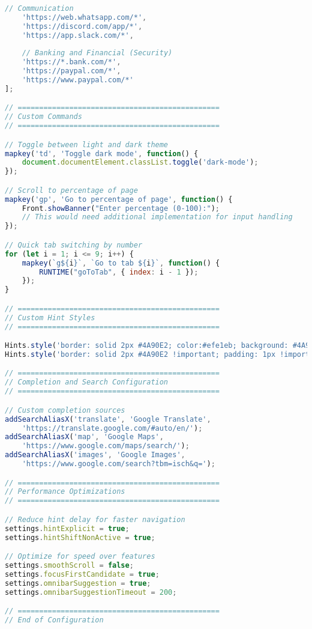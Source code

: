 \documentclass[11pt,a4paper,oneside]{book}
\begin{document}
\begin{codebox}
\begin{lstlisting}[language=JavaScript]
    // Communication
    'https://web.whatsapp.com/*',
    'https://discord.com/app/*',
    'https://app.slack.com/*',
    
    // Banking and Financial (Security)
    'https://*.bank.com/*',
    'https://paypal.com/*',
    'https://www.paypal.com/*'
];

// ===============================================
// Custom Commands
// ===============================================

// Toggle between light and dark theme
mapkey('td', 'Toggle dark mode', function() {
    document.documentElement.classList.toggle('dark-mode');
});

// Scroll to percentage of page
mapkey('gp', 'Go to percentage of page', function() {
    Front.showBanner("Enter percentage (0-100):");
    // This would need additional implementation for input handling
});

// Quick tab switching by number
for (let i = 1; i <= 9; i++) {
    mapkey(`g${i}`, `Go to tab ${i}`, function() {
        RUNTIME("goToTab", { index: i - 1 });
    });
}

// ===============================================
// Custom Hint Styles
// ===============================================

Hints.style('border: solid 2px #4A90E2; color:#efe1eb; background: #4A90E2;');
Hints.style('border: solid 2px #4A90E2 !important; padding: 1px !important; color:#efe1eb !important; background: #4A90E2 !important;', 'text');

// ===============================================
// Completion and Search Configuration
// ===============================================

// Custom completion sources
addSearchAliasX('translate', 'Google Translate', 
    'https://translate.google.com/#auto/en/');
addSearchAliasX('map', 'Google Maps', 
    'https://www.google.com/maps/search/');
addSearchAliasX('images', 'Google Images', 
    'https://www.google.com/search?tbm=isch&q=');

// ===============================================
// Performance Optimizations
// ===============================================

// Reduce hint delay for faster navigation
settings.hintExplicit = true;
settings.hintShiftNonActive = true;

// Optimize for speed over features
settings.smoothScroll = false;
settings.focusFirstCandidate = true;
settings.omnibarSuggestion = true;
settings.omnibarSuggestionTimeout = 200;

// ===============================================
// End of Configuration
\end{lstlisting}
\end{codebox}
\end{document}
